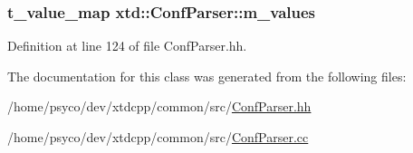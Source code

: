 \subsubsection[{\texorpdfstring{m\+\_\+values}{m_values}}]{\setlength{\rightskip}{0pt plus 5cm}t\+\_\+value\+\_\+map xtd\+::\+Conf\+Parser\+::m\+\_\+values\hspace{0.3cm}{\ttfamily [protected]}}\hypertarget{classxtd_1_1ConfParser_a4c58cc4fa96ebaddd180a0c67edb481f}{}\label{classxtd_1_1ConfParser_a4c58cc4fa96ebaddd180a0c67edb481f}


Definition at line 124 of file Conf\+Parser.\+hh.



The documentation for this class was generated from the following files\+:\begin{DoxyCompactItemize}
\item 
/home/psyco/dev/xtdcpp/common/src/\hyperlink{ConfParser_8hh}{Conf\+Parser.\+hh}\item 
/home/psyco/dev/xtdcpp/common/src/\hyperlink{ConfParser_8cc}{Conf\+Parser.\+cc}\end{DoxyCompactItemize}
